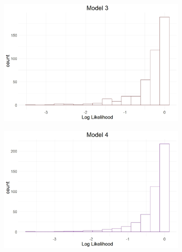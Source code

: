 \documentclass[12pt]{article}
\begin{document}
\begin{figure}[h]
	\centering
	\includegraphics[width=0.8\textwidth]{model_comp_figures/LL_model3.jpeg}
	\caption{}
	\label{}
\end{figure}

\begin{figure}[h]
	\centering
	\includegraphics[width=0.8\textwidth]{model_comp_figures/LL_model4.jpeg}
	\caption{}
	\label{}
\end{figure}



\FloatBarrier
\newpage
\printbibliography
\end{document}
